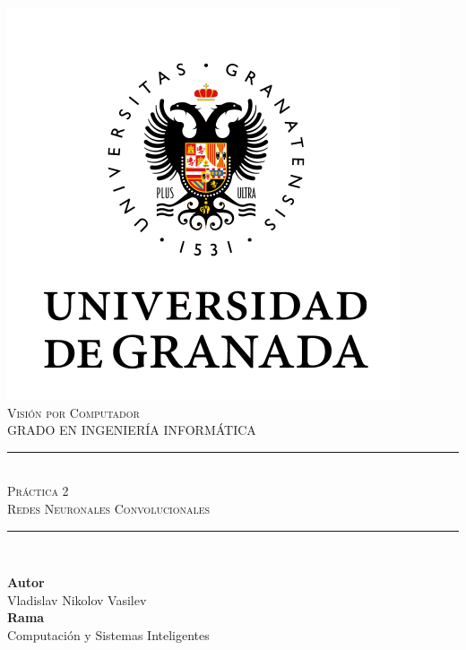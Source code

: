 \documentclass[11pt,a4paper]{article}
\newcommand{\asignatura}{Visión por Computador}
\newcommand{\autor}{Vladislav Nikolov Vasilev}
\newcommand{\titulo}{Práctica 2}
\newcommand{\subtitulo}{Redes Neuronales Convolucionales}
\begin{document}

\begin{titlepage}

\begin{minipage}{\textwidth}

\centering

\includegraphics[scale=0.5]{img/ugr.png}\\

\textsc{\Large \asignatura{}\\[0.2cm]}
\textsc{GRADO EN INGENIERÍA INFORMÁTICA}\\[1cm]

\noindent\rule[-1ex]{\textwidth}{1pt}\\[1.5ex]
\textsc{{\Huge \titulo\\[0.5ex]}}
\textsc{{\Large \subtitulo\\}}
\noindent\rule[-1ex]{\textwidth}{2pt}\\[3.5ex]

\end{minipage}

\vspace{0.5cm}

\begin{minipage}{\textwidth}

\centering

\textbf{Autor}\\ {\autor{}}\\[2.5ex]
\textbf{Rama}\\ {Computación y Sistemas Inteligentes}\\[2.5ex]
\vspace{0.3cm}


\end{minipage}
\end{titlepage}
\end{document}
